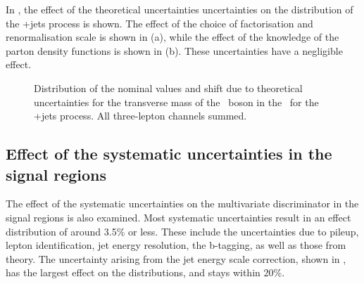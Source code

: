 \newpage
In , the effect of the theoretical uncertainties uncertainties on the distribution of the \WZ+jets process is shown. The effect of the choice of factorisation and renormalisation scale is shown in  (a), while the effect of the knowledge of the parton density functions is shown in  (b). These uncertainties have a negligible effect. 
\begin{figure}[htbp] 
	\centering 

	\caption{Distribution of the nominal values and shift due to  theoretical uncertainties for the transverse mass of the \PW\ boson in the \WZCR\ for the \WZ+jets process. All three-lepton channels summed.}
	\label{fig:shiftMTWt}
\end{figure}


\subsection{Effect of the systematic uncertainties in the signal regions}
\label{sec:BDTsys}
The effect of the systematic uncertainties on the multivariate discriminator in the signal regions is also examined.  Most systematic uncertainties result in an effect distribution of around 3.5\% or less. These include the uncertainties due to pileup,  lepton identification, jet energy resolution, the b-tagging, as well as those from theory. The uncertainty arising from the jet energy scale correction, shown in , has the largest effect on the distributions, and stays within 20\%. 


